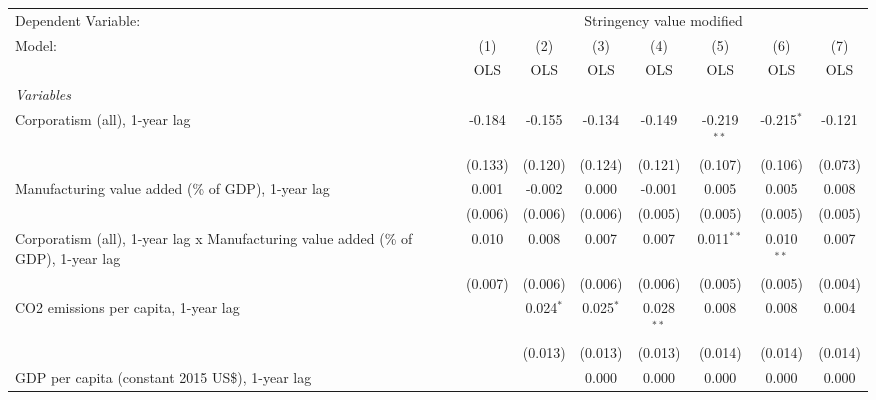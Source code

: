 
\begingroup
\centering
\begin{tabular}{lccccccc}
   \toprule
   Dependent Variable: & \multicolumn{7}{c}{Stringency value modified}\\
   Model:                                                                             & (1)     & (2)         & (3)         & (4)          & (5)           & (6)          & (7)\\  
                                                                                      &  OLS    & OLS         & OLS         & OLS          & OLS           & OLS          & OLS\\  
   \midrule
   \emph{Variables}\\
   Corporatism (all), 1-year lag                                                      & -0.184  & -0.155      & -0.134      & -0.149       & -0.219$^{**}$ & -0.215$^{*}$ & -0.121\\   
                                                                                      & (0.133) & (0.120)     & (0.124)     & (0.121)      & (0.107)       & (0.106)      & (0.073)\\   
   Manufacturing value added (\% of GDP), 1-year lag                                  & 0.001   & -0.002      & 0.000       & -0.001       & 0.005         & 0.005        & 0.008\\   
                                                                                      & (0.006) & (0.006)     & (0.006)     & (0.005)      & (0.005)       & (0.005)      & (0.005)\\   
   Corporatism (all), 1-year lag x Manufacturing value added (\% of GDP), 1-year lag  & 0.010   & 0.008       & 0.007       & 0.007        & 0.011$^{**}$  & 0.010$^{**}$ & 0.007\\   
                                                                                      & (0.007) & (0.006)     & (0.006)     & (0.006)      & (0.005)       & (0.005)      & (0.004)\\   
   CO2 emissions per capita, 1-year lag                                               &         & 0.024$^{*}$ & 0.025$^{*}$ & 0.028$^{**}$ & 0.008         & 0.008        & 0.004\\   
                                                                                      &         & (0.013)     & (0.013)     & (0.013)      & (0.014)       & (0.014)      & (0.014)\\   
   GDP per capita (constant 2015 US\$), 1-year lag                                    &         &             & 0.000       & 0.000        & 0.000         & 0.000        & 0.000\\   

\end{tabular}
